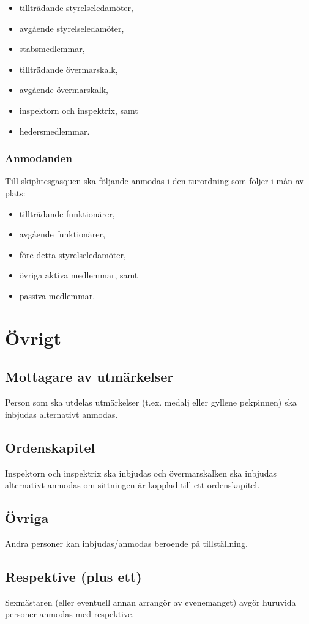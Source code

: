 \documentclass{dsekprotokoll}
\begin{document}
\begin{itemize}
    \item tillträdande styrelseledamöter,
    \item avgående styrelseledamöter,
    \item stabsmedlemmar,
    \item tillträdande övermarskalk,
    \item avgående övermarskalk,
    \item inspektorn och inspektrix, samt
    \item hedersmedlemmar.
\end{itemize}

\subsubsection{Anmodanden}

Till skiphtesgasquen ska följande anmodas i den turordning som följer i mån av plats:
  \begin{itemize}
    \item tillträdande funktionärer,
    \item avgående funktionärer,
    \item före detta styrelseledamöter,
    \item övriga aktiva medlemmar, samt
    \item passiva medlemmar.
  \end{itemize}


\section{Övrigt}

\subsection{Mottagare av utmärkelser}
Person som ska utdelas utmärkelser (t.ex. medalj eller gyllene pekpinnen) ska inbjudas alternativt anmodas.

\subsection{Ordenskapitel}
Inspektorn och inspektrix ska inbjudas och övermarskalken
ska inbjudas alternativt anmodas om sittningen är kopplad
till ett ordenskapitel.

\subsection{Övriga}
Andra personer kan inbjudas/anmodas beroende på tillställning.

\subsection{Respektive (plus ett)}
Sexmästaren (eller eventuell annan arrangör av evenemanget) avgör huruvida personer anmodas med respektive.
\end{document}
